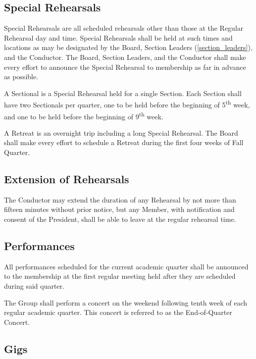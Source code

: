 \documentclass{article}
\begin{document}
\subsection{Special Rehearsals}

Special Rehearsals are all scheduled rehearsals other than those at the Regular
Rehearsal day and time. Special Rehearsals shall be held at such times and
locations as may be designated by the Board, Section Leaders (\ref{section_leaders}),
and the Conductor. The Board, Section Leaders, and the Conductor shall make
every effort to announce the Special Rehearsal to membership as far in advance
as possible.

A Sectional is a Special Rehearsal held for a single Section. Each Section shall
have two Sectionals per quarter, one to be held before the beginning of 5\textsuperscript{th}
week, and one to be held before the beginning of 9\textsuperscript{th} week.

A Retreat is an overnight trip including a long Special Rehearsal. The Board
shall make every effort to schedule a Retreat during the first four weeks of
Fall Quarter.

\subsection{Extension of Rehearsals}

The Conductor may extend the duration of any Rehearsal by not more
than fifteen minutes without prior notice, but any Member, with notification
and consent of the President, shall be able to leave at the regular
rehearsal time.

\subsection{Performances}

All performances scheduled for the current academic quarter shall
be announced to the membership at the first regular meeting held after
they are scheduled during said quarter.

The Group shall perform a concert on the weekend following tenth week of each
regular academic quarter. This concert is referred to as the End-of-Quarter Concert.

\subsection{Gigs} \label{gig}
\end{document}
